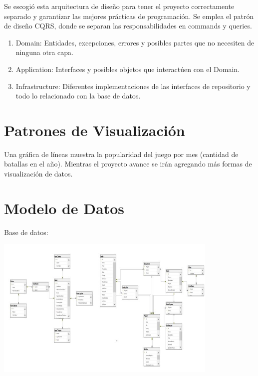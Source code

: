 \documentclass[15pt,a4paper]{article}
\begin{document}
Se escogió esta arquitectura de diseño para tener el proyecto correctamente separado y 
garantizar las mejores prácticas de programación. Se emplea el patrón de diseño CQRS, 
donde se separan las responsabilidades en commands y queries.
\begin{enumerate}
\item Domain: Entidades, excepciones, errores y posibles partes que no necesiten de ninguna 
otra capa.
\item Application: Interfaces y posibles objetos que interactúen con el Domain.
\item Infrastructure: Diferentes implementaciones de las interfaces de repositorio y todo lo 
relacionado con la base de datos.
\end{enumerate}

\section{Patrones de Visualización}
Una gráfica de líneas muestra la popularidad del juego por mes (cantidad de batallas en 
el año). Mientras el proyecto avance se irán agregando más formas de visualización de 
datos.

\section{Modelo de Datos}
Base de datos:
\begin{center}
\includegraphics[width=0.8\textwidth]{bd}
\end{center}
\end{document}
